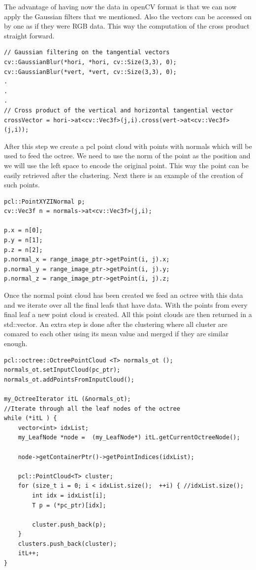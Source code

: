 \documentclass[fontsize=12pt]{article}
\begin{document}
The advantage of having now the data in openCV format is that we can now apply the Gaussian filters that we mentioned. Also the vectors can be accessed on by one as if they were RGB data. This way the computation of the cross product straight forward.

\begin{lstlisting}
// Gaussian filtering on the tangential vectors
cv::GaussianBlur(*hori, *hori, cv::Size(3,3), 0);
cv::GaussianBlur(*vert, *vert, cv::Size(3,3), 0);
.
.
.
// Cross product of the vertical and horizontal tangential vector
crossVector = hori->at<cv::Vec3f>(j,i).cross(vert->at<cv::Vec3f>(j,i));
\end{lstlisting}

After this step we create a pcl point cloud with points with normals which will be used to feed the octree. We need to use the norm of the point as the position and we will use the left space to encode the original point. This way the point can be easily retrieved after the clustering. Next there is an example of the creation of such points.

\begin{lstlisting}
pcl::PointXYZINormal p;
cv::Vec3f n = normals->at<cv::Vec3f>(j,i);

p.x = n[0];
p.y = n[1];
p.z = n[2];
p.normal_x = range_image_ptr->getPoint(i, j).x;
p.normal_y = range_image_ptr->getPoint(i, j).y;
p.normal_z = range_image_ptr->getPoint(i, j).z;
\end{lstlisting}

Once the normal point cloud has been created we feed an octree with this data and we iterate over all the final leafs that have data. With the points from every final leaf a new point cloud is created. All this point clouds are then returned in a std::vector. An extra step is done after the clustering where all cluster are comared to each other using its mean value and merged if they are similar enough.\\

\begin{lstlisting}
pcl::octree::OctreePointCloud <T> normals_ot (); 
normals_ot.setInputCloud(pc_ptr);
normals_ot.addPointsFromInputCloud();

my_OctreeIterator itL (&normals_ot);
//Iterate through all the leaf nodes of the octree
while (*itL ) {
    vector<int> idxList;
    my_LeafNode *node =  (my_LeafNode*) itL.getCurrentOctreeNode();
    
    node->getContainerPtr()->getPointIndices(idxList);

    pcl::PointCloud<T> cluster;
    for (size_t i = 0; i < idxList.size();  ++i) { //idxList.size();
        int idx = idxList[i];
        T p = (*pc_ptr)[idx];
        
        cluster.push_back(p);	
    }
    clusters.push_back(cluster);
    itL++;
}
\end{lstlisting}
\end{document}
